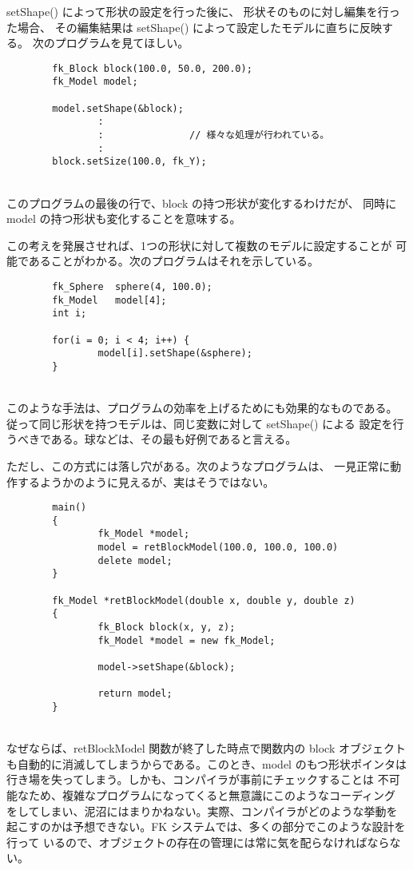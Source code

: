 setShape() によって形状の設定を行った後に、
形状そのものに対し編集を行った場合、
その編集結果は setShape() によって設定したモデルに直ちに反映する。
次のプログラムを見てほしい。
\\
\begin{breakbox}
\begin{verbatim}
        fk_Block block(100.0, 50.0, 200.0);
        fk_Model model;

        model.setShape(&block);
                :
                :               // 様々な処理が行われている。
                :
        block.setSize(100.0, fk_Y);
\end{verbatim}
\end{breakbox}
~ \\
このプログラムの最後の行で、block の持つ形状が変化するわけだが、
同時に model の持つ形状も変化することを意味する。

この考えを発展させれば、1つの形状に対して複数のモデルに設定することが
可能であることがわかる。次のプログラムはそれを示している。
\\
\begin{breakbox}
\begin{verbatim}
        fk_Sphere  sphere(4, 100.0);
        fk_Model   model[4];
        int i;

        for(i = 0; i < 4; i++) {
                model[i].setShape(&sphere);
        }
\end{verbatim}
\end{breakbox}
~ \\
このような手法は、プログラムの効率を上げるためにも効果的なものである。
従って同じ形状を持つモデルは、同じ変数に対して setShape() による
設定を行うべきである。球などは、その最も好例であると言える。

ただし、この方式には落し穴がある。次のようなプログラムは、
一見正常に動作するようかのように見えるが、実はそうではない。
\\
\begin{breakbox}
\begin{verbatim}
        main()
        {
                fk_Model *model;
                model = retBlockModel(100.0, 100.0, 100.0)
                delete model;
        }

        fk_Model *retBlockModel(double x, double y, double z)
        {
                fk_Block block(x, y, z);
                fk_Model *model = new fk_Model;
        
                model->setShape(&block);
        
                return model;
        }
\end{verbatim}
\end{breakbox}
~ \\
なぜならば、retBlockModel 関数が終了した時点で関数内の block オブジェクト
も自動的に消滅してしまうからである。このとき、model のもつ形状ポインタは
行き場を失ってしまう。しかも、コンパイラが事前にチェックすることは
不可能なため、複雑なプログラムになってくると無意識にこのようなコーディング
をしてしまい、泥沼にはまりかねない。実際、コンパイラがどのような挙動を
起こすのかは予想できない。FK システムでは、多くの部分でこのような設計を行って
いるので、オブジェクトの存在の管理には常に気を配らなければならない。
